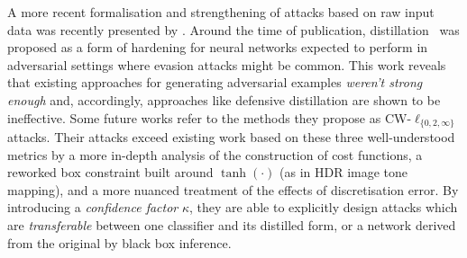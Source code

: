 A more recent formalisation and strengthening of attacks based on raw input data was recently presented by \textcite{DBLP:conf/sp/Carlini017}.
Around the time of publication, distillation~\parencite{DBLP:conf/sp/PapernotM0JS16} was proposed as a form of hardening for neural networks expected to perform in adversarial settings where evasion attacks might be common.
This work reveals that existing approaches for generating adversarial examples \emph{weren't strong enough} and, accordingly, approaches like defensive distillation are shown to be ineffective.
Some future works refer to the methods they propose as CW-$\ell_{\{0, 2, \infty\}}$ attacks.
Their attacks exceed existing work based on these three well-understood metrics by a more in-depth analysis of the construction of cost functions, a reworked box constraint built around $\tanh(\cdot)$ (as in HDR image tone mapping), and a more nuanced treatment of the effects of discretisation error.
By introducing a \emph{confidence factor} $\kappa$, they are able to explicitly design attacks which are \emph{transferable} between one classifier and its distilled form, or a network derived from the original by black box inference.



